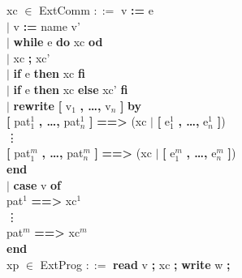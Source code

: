 \documentclass[a4paper,10pt]{article}
\newcommand{\nt}[1]{\textbf{#1}}
\begin{document}
xc $\in$ ExtComm $::=$ v \nt{:=} e \\
\indent \hspace{72pt} $|$ v \nt{:=} name v' \\
\indent \hspace{72pt} $|$ \nt{while} e \nt{do} xc \nt{od}\\
\indent \hspace{72pt} $|$ xc \nt{;} xc'\\
\indent \hspace{72pt} $|$ \nt{if} e \nt{then} xc \nt{fi}\\
\indent \hspace{72pt} $|$ \nt{if} e \nt{then} xc \nt{else} xc' \nt{fi}\\
\indent \hspace{72pt} $|$ \nt{rewrite} \nt{[} v$_1$ \nt{, \ldots ,} v$_n$ \nt{]} \nt{by}\\
\indent \hspace{92pt} \nt{[} pat$^1_1$ \nt{, \ldots ,} pat$^1_n$ \nt{]} \nt{==\textgreater} 
(xc $|$ \nt{[} e$^1_1$ \nt{, \ldots ,} e$^1_n$ \nt{]})\\
\indent \hspace{185pt} \vdots\\
\indent \hspace{92pt} \nt{[} pat$^m_1$ \nt{, \ldots ,} pat$^m_n$ \nt{]} \nt{==\textgreater} 
(xc $|$ \nt{[} e$^m_1$ \nt{, \ldots ,} e$^m_n$ \nt{]})\\
\indent \hspace{78pt} \nt{end}\\
\indent \hspace{72pt} $|$ \nt{case} v \nt{of}\\
\indent \hspace{92pt} pat$^1$ \nt{==\textgreater} xc$^1$\\
\indent \hspace{120pt} \vdots\\
\indent \hspace{92pt} pat$^m$ \nt{==\textgreater} xc$^m$\\
\indent \hspace{78pt} \nt{end}\\

xp $\in$ ExtProg $::=$ \nt{read} v \nt{;} xc \nt{;} \nt{write} w \nt{;}
\end{document}
